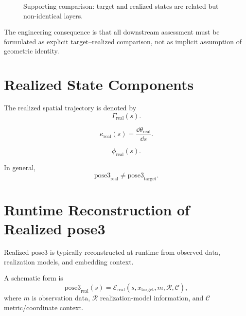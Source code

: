\begin{figure}[ht]
\centering

\caption{Supporting comparison: target and realized states are related but non-identical layers.}
\label{fig:support-target-vs-realized}
\end{figure}

The engineering consequence is that all downstream assessment must be
formulated as explicit target--realized comparison, not as implicit
assumption of geometric identity.

\section{Realized State Components}

\begin{definition}
\label{def:realized-spatial-trajectory}
The realized spatial trajectory is denoted by
\[
\Gamma_{\mathrm{real}}(s).
\]
\end{definition}

\begin{definition}
\label{def:realized-pose3-curvature}
\[
\kappa_{\mathrm{real}}(s)=\frac{\dd\theta_{\mathrm{real}}}{\dd s}.
\]
\end{definition}

\begin{definition}
\label{def:realized-cant}
\[
\phi_{\mathrm{real}}(s).
\]
\end{definition}

In general,
\[
\mathrm{pose3}_{\mathrm{real}}
\neq
\mathrm{pose3}_{\mathrm{target}}.
\]

\section{Runtime Reconstruction of Realized pose3}

Realized pose3 is typically reconstructed at runtime from observed data,
realization models, and embedding context.

\begin{definition}
\label{def:runtime-realization-reconstruction}
A schematic form is
\[
\mathrm{pose3}_{\mathrm{real}}(s)
=
\mathcal E_{\mathrm{real}}(s,x_{\mathrm{target}},m,\mathcal R,\mathcal C),
\]
where \(m\) is observation data, \(\mathcal R\) realization-model
information, and \(\mathcal C\) metric/coordinate context.
\end{definition}

